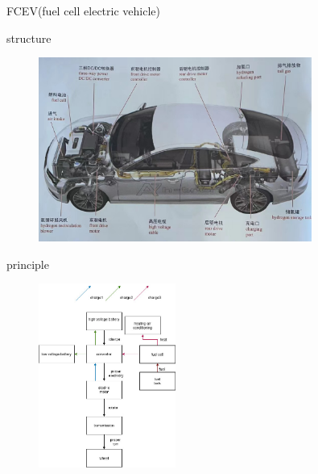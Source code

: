 \begin{frame}
	\begin{block}{FCEV(fuel cell electric vehicle)}
		\begin{compactitem}
			\item structure
			\begin{figure}[htbp]
				\centering
				\includegraphics[width=0.8\textwidth]{1-23}
			\end{figure}			
		\end{compactitem}
	\end{block}
\end{frame}
\begin{frame}
	\begin{block}{}
		\begin{compactitem}
			\item principle
			\begin{figure}[htbp]
				\centering
				\includegraphics[width=0.4\textwidth]{1-24}
			\end{figure}
		\end{compactitem}
	\end{block}
\end{frame}





